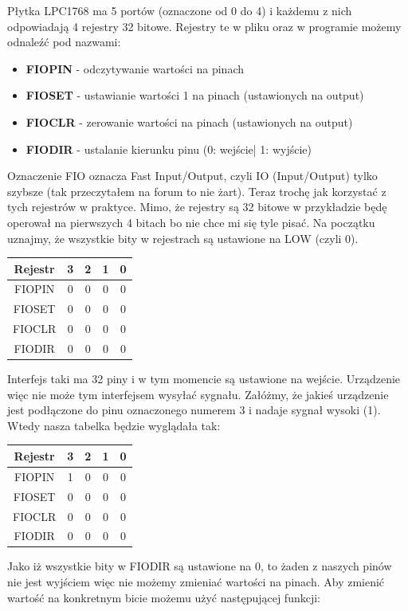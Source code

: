 \documentclass[11pt]{article}
\begin{document}
Płytka LPC1768 ma 5 portów (oznaczone od 0 do 4) i każdemu z nich
odpowiadają 4 rejestry 32 bitowe. Rejestry te w pliku oraz w programie możemy
odnaleźć pod nazwami:
\begin{itemize}
    \item \textbf{FIOPIN} - odczytywanie wartości na pinach
    \item \textbf{FIOSET} - ustawianie wartości 1 na pinach (ustawionych na output)
    \item \textbf{FIOCLR} - zerowanie wartości na pinach (ustawionych na output)
    \item \textbf{FIODIR} - ustalanie kierunku pinu (0: wejście| 1: wyjście)
\end{itemize}
Oznaczenie FIO oznacza Fast Input/Output, czyli IO (Input/Output) tylko szybsze
(tak przeczytałem na forum to nie żart). Teraz trochę jak korzystać z tych rejestrów w praktyce.
Mimo, że rejestry są 32 bitowe w przykładzie będę operował na pierwszych 4 bitach
bo nie chce mi się tyle pisać.
Na początku uznajmy, że wszystkie bity w rejestrach są ustawione na LOW (czyli 0).
\begin{table}[H]
    \centering
    \begin{tabular}{|c|c|c|c|c|}
        \hline
        Rejestr & 3 & 2 & 1 & 0 \\ \hline
        FIOPIN & 0 & 0 & 0 & 0 \\ \hline
        FIOSET & 0 & 0 & 0 & 0 \\ \hline
        FIOCLR & 0 & 0 & 0 & 0 \\ \hline
        FIODIR & 0 & 0 & 0 & 0 \\ \hline
    \end{tabular}
\end{table}
Interfejs taki ma 32 piny i w tym momencie są ustawione na wejście. Urządzenie więc
nie może tym interfejsem wysyłać sygnału. Załóżmy, że jakieś urządzenie jest podłączone
do pinu oznaczonego numerem 3 i nadaje sygnał wysoki (1). Wtedy nasza tabelka będzie wyglądała tak:
\begin{table}[H]
    \centering
    \begin{tabular}{|c|c|c|c|c|}
        \hline
        Rejestr & 3 & 2 & 1 & 0 \\ \hline
        FIOPIN & 1 & 0 & 0 & 0 \\ \hline
        FIOSET & 0 & 0 & 0 & 0 \\ \hline
        FIOCLR & 0 & 0 & 0 & 0 \\ \hline
        FIODIR & 0 & 0 & 0 & 0 \\ \hline
    \end{tabular}
\end{table}
Jako iż wszystkie bity w FIODIR są ustawione na 0, to żaden z naszych pinów nie jest
wyjściem więc nie możemy zmieniać wartości na pinach. Aby zmienić wartość na konkretnym bicie
możemu użyć następującej funkcji:
\end{document}
